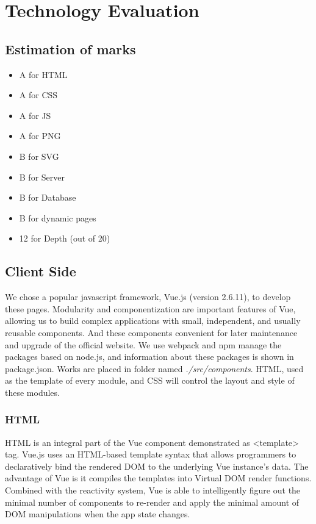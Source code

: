 \documentclass{article}
\begin{document}
\section{Technology Evaluation}
\subsection{Estimation of marks}
\begin{itemize}
    \item A for HTML
    \item A for CSS
    \item A for JS
    \item A for PNG
    \item B for SVG
    \item B for Server
    \item B for Database
    \item B for dynamic pages
    \item 12 for Depth (out of 20)
\end{itemize} 

\subsection{Client Side}
We chose a popular javascript framework, Vue.js (version 2.6.11), to 
develop these pages.
Modularity and componentization are important features of Vue,  
allowing us to build complex applications with small, independent, 
and usually reusable components. And these components convenient 
for later maintenance and upgrade of the official website. 
We use webpack and npm manage the packages based on node.js, and 
information about these packages is shown in package.json. Works are 
placed in folder named \textit{./src/components}. HTML, used as 
the template of every module, and CSS will control the layout 
and style of these modules.

\subsubsection{HTML}
HTML is an integral part of the Vue component demonstrated as \textless template\textgreater \space
tag. 
Vue.js uses an HTML-based template syntax that allows programmers to declaratively 
bind the rendered DOM to the underlying Vue instance’s data. The advantage of Vue 
is it compiles the templates into Virtual DOM render functions. Combined with the 
reactivity system, Vue is able to intelligently figure out the minimal number of 
components to re-render and apply the minimal amount of DOM manipulations when the 
app state changes.
\end{document}
